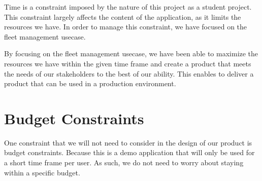 Time is a constraint imposed by the nature of this project as a student project. This constraint largely affects the content of the application, as it limits the resources we have. In order to manage this constraint, we have focused on the fleet management \gls{usecase}.

By focusing on the fleet management \gls{usecase}, we have been able to maximize the resources we have within the given time frame and create a product that meets the needs of our \glspl{stakeholder} to the best of our ability. This enables to deliver a product that can be used in a production environment.



\section{Budget Constraints}

One constraint that we will not need to consider in the design of our product is budget constraints. Because this is a demo application that will only be used for a short time frame per user. As such, we do not need to worry about staying within a specific budget.